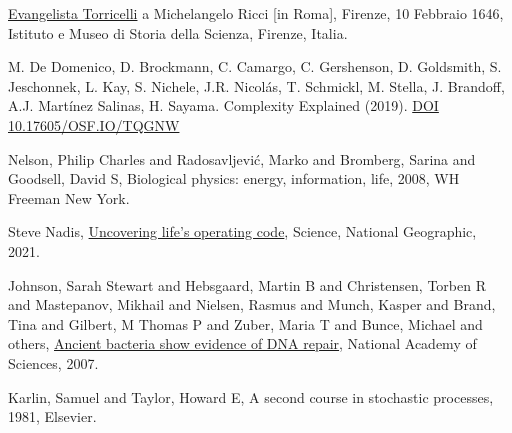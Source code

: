 
\cleardoublepage
{}
\begin{thebibliography}{99}

%
%

\href{http://www.imss.fi.it/multi/torricel/le100246.html}{Evangelista Torricelli} a Michelangelo Ricci [in Roma], Firenze, 10 Febbraio 1646,
Istituto e Museo di Storia della Scienza, Firenze, Italia.

M. De Domenico, D. Brockmann, C. Camargo, C. Gershenson, D. Goldsmith, S. Jeschonnek, L. Kay, S. Nichele, J.R. Nicolás, T. Schmickl, M. Stella, J. Brandoff, A.J. Martínez Salinas, H. Sayama. Complexity Explained (2019). \href{https://complexityexplained.github.io/}{DOI 10.17605/OSF.IO/TQGNW}

Nelson, Philip Charles and Radosavljevi{\'c}, Marko and Bromberg, Sarina and Goodsell, David S, Biological physics: energy, information, life, 2008, WH Freeman New York.

Steve Nadis, \href{https://www.nationalgeographic.com/science/article/uncovering-lifes-operating-code}{Uncovering life's operating code}, Science, National Geographic, 2021.

Johnson, Sarah Stewart and Hebsgaard, Martin B and Christensen, Torben R and Mastepanov, Mikhail and Nielsen, Rasmus and Munch, Kasper and Brand, Tina and Gilbert, M Thomas P and Zuber, Maria T and Bunce, Michael and others, \href{https://www.pnas.org/doi/10.1073/pnas.0706787104}{Ancient bacteria show evidence of DNA repair}, National Academy of Sciences, 2007.

Karlin, Samuel and Taylor, Howard E, A second course in stochastic processes, 1981, Elsevier.


 
 

\end{thebibliography}
